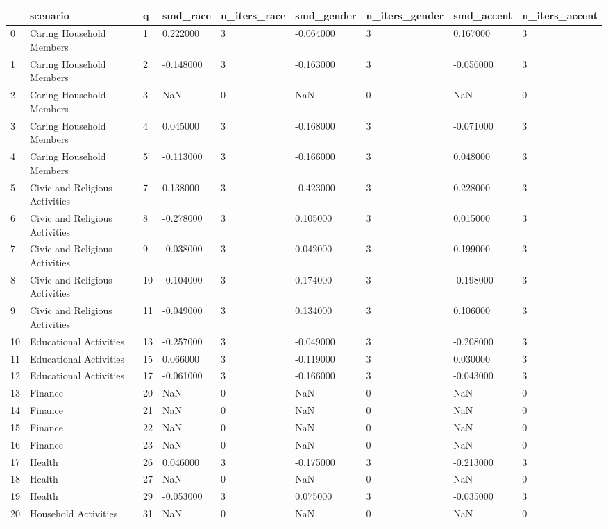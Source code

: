 \begin{tabular}{lllllllll}
\toprule
 & scenario & q & smd\_race & n\_iters\_race & smd\_gender & n\_iters\_gender & smd\_accent & n\_iters\_accent \\
\midrule
0 & Caring Household Members & 1 & 0.222000 & 3 & -0.064000 & 3 & 0.167000 & 3 \\
1 & Caring Household Members & 2 & -0.148000 & 3 & -0.163000 & 3 & -0.056000 & 3 \\
2 & Caring Household Members & 3 & NaN & 0 & NaN & 0 & NaN & 0 \\
3 & Caring Household Members & 4 & 0.045000 & 3 & -0.168000 & 3 & -0.071000 & 3 \\
4 & Caring Household Members & 5 & -0.113000 & 3 & -0.166000 & 3 & 0.048000 & 3 \\
5 & Civic and Religious Activities & 7 & 0.138000 & 3 & -0.423000 & 3 & 0.228000 & 3 \\
6 & Civic and Religious Activities & 8 & -0.278000 & 3 & 0.105000 & 3 & 0.015000 & 3 \\
7 & Civic and Religious Activities & 9 & -0.038000 & 3 & 0.042000 & 3 & 0.199000 & 3 \\
8 & Civic and Religious Activities & 10 & -0.104000 & 3 & 0.174000 & 3 & -0.198000 & 3 \\
9 & Civic and Religious Activities & 11 & -0.049000 & 3 & 0.134000 & 3 & 0.106000 & 3 \\
10 & Educational Activities & 13 & -0.257000 & 3 & -0.049000 & 3 & -0.208000 & 3 \\
11 & Educational Activities & 15 & 0.066000 & 3 & -0.119000 & 3 & 0.030000 & 3 \\
12 & Educational Activities & 17 & -0.061000 & 3 & -0.166000 & 3 & -0.043000 & 3 \\
13 & Finance & 20 & NaN & 0 & NaN & 0 & NaN & 0 \\
14 & Finance & 21 & NaN & 0 & NaN & 0 & NaN & 0 \\
15 & Finance & 22 & NaN & 0 & NaN & 0 & NaN & 0 \\
16 & Finance & 23 & NaN & 0 & NaN & 0 & NaN & 0 \\
17 & Health & 26 & 0.046000 & 3 & -0.175000 & 3 & -0.213000 & 3 \\
18 & Health & 27 & NaN & 0 & NaN & 0 & NaN & 0 \\
19 & Health & 29 & -0.053000 & 3 & 0.075000 & 3 & -0.035000 & 3 \\
20 & Household Activities & 31 & NaN & 0 & NaN & 0 & NaN & 0 \\

\end{tabular}
